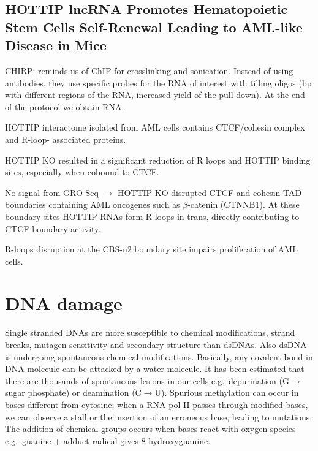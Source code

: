 \hypertarget{hottip-lncrna-promotes-hematopoietic-stem-cells-self-renewal-leading-to-aml-like-disease-in-mice}{%
\subsection{HOTTIP lncRNA Promotes Hematopoietic Stem Cells Self-Renewal Leading to AML-like Disease in Mice}\label{hottip-lncrna-promotes-hematopoietic-stem-cells-self-renewal-leading-to-aml-like-disease-in-mice}}

CHIRP: reminds us of ChIP for crosslinking and sonication. Instead of using antibodies, they use specific probes for the RNA of interest with tilling oligos (bp with different regions of the RNA, increased yield of the pull down). At the end of the protocol we obtain RNA.

HOTTIP interactome isolated from AML cells contains CTCF/cohesin complex and R-loop- associated proteins.

HOTTIP KO resulted in a significant reduction of R loops and HOTTIP binding sites, especially when cobound to CTCF.

No signal from GRO-Seq $\rightarrow$ HOTTIP KO disrupted CTCF and cohesin TAD boundaries containing AML oncogenes such as $\beta$-catenin (CTNNB1). At these boundary sites HOTTIP RNAs form R-loops in trans,  directly contributing to CTCF boundary activity.

R-loops disruption at the CBS-u2 boundary site impairs proliferation of AML cells.

\hypertarget{dna-damage}{%
\section{DNA damage}\label{dna-damage}}

Single stranded DNAs are more susceptible to chemical modifications, strand breaks, mutagen sensitivity and secondary structure than dsDNAs. Also dsDNA is undergoing spontaneous chemical modifications. Basically, any covalent bond in DNA molecule can be attacked by a water molecule. It has been estimated that there are thousands of spontaneous lesions in our cells e.g.~depurination (G$\rightarrow$sugar phosphate) or deamination (C$\rightarrow$U). Spurious methylation can occur in bases different from cytosine; when a RNA pol II passes through modified bases, we can observe a stall or the insertion of an erroneous base, leading to mutations. The addition of chemical groups occurs when bases react with oxygen species e.g.~guanine + adduct radical gives 8-hydroxyguanine.

